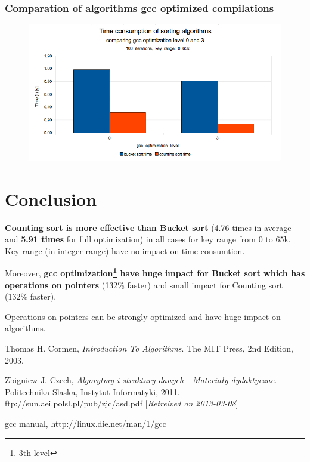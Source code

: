 \documentclass[12pt]{article}
\begin{document}
\subsubsection{Comparation of algorithms gcc optimized compilations}

\begin{figure}[H]
    \centering
    \includegraphics[width=1\textwidth]{compare-gcc-opt-0and3}
\end{figure}

\section{Conclusion}

\textbf{Counting sort is more effective than Bucket sort} (4.76 times in average and \textbf{5.91 times} for full optimization) in all cases for key range from 0 to 65k. Key range (in integer range) have no impact on time consumtion.

Moreover, \textbf{gcc optimization\footnote{3th level} have huge impact for Bucket sort which has operations on pointers} (132\% faster) and small impact for Counting sort (132\% faster).

Operations on pointers can be strongly optimized and have huge impact on algorithms.

\newpage
\begin{thebibliography}{9}

  Thomas H. Cormen,
  \emph{Introduction To Algorithms}.
  The MIT Press,
  2nd Edition,
  2003.

  Zbigniew J. Czech,
  \emph{Algorytmy i struktury danych - Materiały dydaktyczne}.
  Politechnika Slaska, Instytut Informatyki,
  2011.
  ftp://sun.aei.polsl.pl/pub/zjc/asd.pdf [\emph{Retreived on 2013-03-08}]

  gcc manual,
  http://linux.die.net/man/1/gcc

\end{thebibliography}
\end{document}
